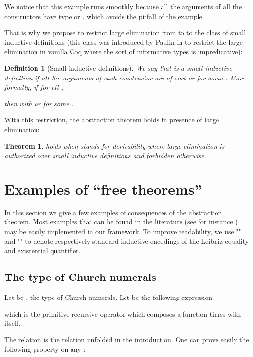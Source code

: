 \documentclass[a4paper,USenglish]{lipics}
\newtheorem{thm}{Theorem}
\newtheorem{dfn}{Definition}
\def\coq{\textsf{Coq}\xspace}
\begin{document}
We notice that this example runs smoothly because all the arguments of
all the constructors have type  or , which avoids the
pitfall of the  example.

That is why we propose to restrict large elimination from  to
 to the class of small inductive definitions (this class was
introduced by Paulin in \cite{springerlink:10.1007/BFb0037116} to
restrict the large elimination in vanilla \coq where the sort  of
informative types is impredicative):
\begin{dfn}[Small inductive definitions]
 We say that  is a \emph{small
 inductive definition} if all the arguments of each constructor
 are of sort  or  for some . More formally,
 if for all ,

 then  with  or
  for some .
\end{dfn}

With this restriction, the abstraction theorem holds in presence of
large elimination:
\begin{thm}
   holds
  when  stands for derivability where large elimination
  is authorized over small inductive definitions and forbidden
  otherwise.
\end{thm}


\section{Examples of ``free theorems''}\label{sec:examples}

In this section we give a few examples of consequences of the abstraction
theorem. Most examples that can be found in the literature (see for
instance \cite{Wadler89, DBLP:conf/icfp/BernardyJP10})
may be easily implemented in our framework.
To improve readability, we use "" and "" to denote respectively
standard inductive encodings of the Leibniz equality and existential quantifier.

\subsection{The type of Church numerals}\label{sec:examples:church}

Let  be , the type
of Church numerals. Let  be the following expression

which is the primitive recursive operator which composes a function
 times with itself.

The relation  is the
relation unfolded in the introduction. One can prove easily the following
property on any :
\end{document}
